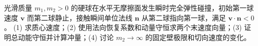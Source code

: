 光滑质量 \(m_1,m_2>0\) 的硬球在水平无摩擦面发生瞬时完全弹性碰撞，初始第一球速度 \(\boldsymbol v\) 而第二球静止，接触瞬间单位法线 \(\boldsymbol n\) 从第二球指向第一球，满足 \(\boldsymbol v\cdot\boldsymbol n<0\)。
(1) 求质心速度；(2) 使用法向恢复系数和动量守恒求两个末速度向量；(3) 证明总动能守恒并计算冲量；(4) 讨论 \(m_2\to\infty\) 的固定壁极限和切向速度的变化。
